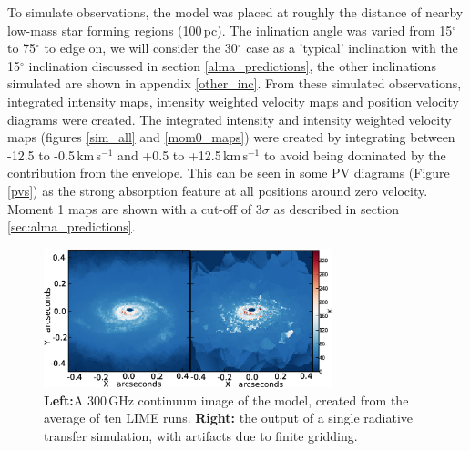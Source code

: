 \documentclass[useAMS,usenatbib]{mn2e}
\begin{document}
To simulate observations, the model was placed at roughly the distance of nearby low-mass star forming regions (100$\,$pc). The inlination angle was varied from 15$^\circ$ to 75$^\circ$ to edge on, we will consider the 30$^\circ$ case as a 'typical' inclination with the 15$^\circ$ inclination discussed in section \ref{alma_predictions}, the other inclinations simulated are shown in appendix \ref{other_inc}. From these simulated observations, integrated intensity maps, intensity weighted velocity maps and position velocity diagrams were created. The integrated intensity and intensity weighted velocity maps (figures \ref{sim_all} and \ref{mom0_maps}) were created by integrating between -12.5 to -0.5$\,$km$\,$s$^{-1}$ and +0.5 to +12.5$\,$km$\,$s$^{-1}$ to avoid being dominated by the contribution from the envelope. This can be seen in some PV diagrams  (Figure \ref{pvs}) as the strong absorption feature at all positions around zero velocity. Moment 1 maps are shown with a cut-off of 3$\sigma$ as described in section \ref{sec:alma_predictions}.\smallskip

\begin{figure}
 \includegraphics[width=84mm]{Figures/sim/continuum.eps}
 \caption{{\bf Left:}A 300$\,$GHz continuum image of the model, created from the average of ten LIME runs. {\bf Right:} the output of a single radiative transfer simulation, with artifacts due to finite gridding.}
 \label{averages}
\end{figure}
\end{document}
